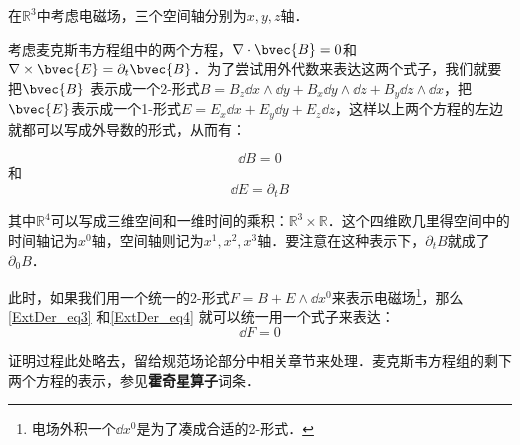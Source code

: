 

在$\mathbb{R}^3$中考虑电磁场，三个空间轴分别为$x, y, z$轴．

考虑麦克斯韦方程组中的两个方程，$\nabla\cdot\bvec{B}=0$和$\nabla\times\bvec{E}=\partial_t\bvec{B}$．为了尝试用外代数来表达这两个式子，我们就要把$\bvec{B}$
表示成一个2-形式$B=B_z\dd x\wedge\dd y+B_x\dd y\wedge\dd z+B_y\dd z\wedge\dd x$，把$\bvec{E}$表示成一个1-形式$E=E_x\dd x+E_y\dd y+E_z\dd z$，这样以上两个方程的左边就都可以写成外导数的形式，从而有：

\begin{equation}\label{ExtDer_eq3}
\dd B=0
\end{equation}
和
\begin{equation}\label{ExtDer_eq4}
\dd E=\partial_tB
\end{equation}

其中$\mathbb{R}^4$可以写成三维空间和一维时间的乘积：$\mathbb{R}^3\times\mathbb{R}$．这个四维欧几里得空间中的时间轴记为$x^0$轴，空间轴则记为$x^1, x^2, x^3$轴．要注意在这种表示下，$\partial_tB$就成了$\partial_0B$．

此时，如果我们用一个统一的2-形式$F=B+E\wedge\dd x^0$来表示电磁场\footnote{电场外积一个$\dd x^0$是为了凑成合适的2-形式．}，那么\autoref{ExtDer_eq3} 和\autoref{ExtDer_eq4} 就可以统一用一个式子来表达：
\begin{equation}
\dd F=0
\end{equation}

证明过程此处略去，留给规范场论部分中相关章节来处理．麦克斯韦方程组的剩下两个方程的表示，参见\textbf{霍奇星算子}词条．


